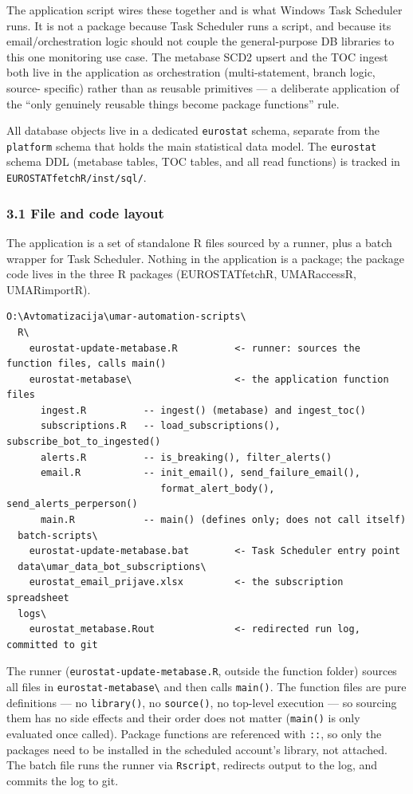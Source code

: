 \documentclass[
]{article}
\begin{document}
The application script wires these together and is what Windows Task
Scheduler runs. It is not a package because Task Scheduler runs a
script, and because its email/orchestration logic should not couple the
general-purpose DB libraries to this one monitoring use case. The
metabase SCD2 upsert and the TOC ingest both live in the application as
orchestration (multi-statement, branch logic, source- specific) rather
than as reusable primitives --- a deliberate application of the ``only
genuinely reusable things become package functions'' rule.

All database objects live in a dedicated \texttt{eurostat} schema,
separate from the \texttt{platform} schema that holds the main
statistical data model. The \texttt{eurostat} schema DDL (metabase
tables, TOC tables, and all read functions) is tracked in
\texttt{EUROSTATfetchR/inst/sql/}.

\subsubsection{3.1 File and code layout}\label{file-and-code-layout}

The application is a set of standalone R files sourced by a runner, plus
a batch wrapper for Task Scheduler. Nothing in the application is a
package; the package code lives in the three R packages (EUROSTATfetchR,
UMARaccessR, UMARimportR).

\begin{verbatim}
O:\Avtomatizacija\umar-automation-scripts\
  R\
    eurostat-update-metabase.R          <- runner: sources the function files, calls main()
    eurostat-metabase\                  <- the application function files
      ingest.R          -- ingest() (metabase) and ingest_toc()
      subscriptions.R   -- load_subscriptions(), subscribe_bot_to_ingested()
      alerts.R          -- is_breaking(), filter_alerts()
      email.R           -- init_email(), send_failure_email(),
                           format_alert_body(), send_alerts_perperson()
      main.R            -- main() (defines only; does not call itself)
  batch-scripts\
    eurostat-update-metabase.bat        <- Task Scheduler entry point
  data\umar_data_bot_subscriptions\
    eurostat_email_prijave.xlsx         <- the subscription spreadsheet
  logs\
    eurostat_metabase.Rout              <- redirected run log, committed to git
\end{verbatim}

The runner (\texttt{eurostat-update-metabase.R}, outside the function
folder) sources all files in \texttt{eurostat-metabase\textbackslash{}}
and then calls \texttt{main()}. The function files are pure definitions
--- no \texttt{library()}, no \texttt{source()}, no top-level execution
--- so sourcing them has no side effects and their order does not matter
(\texttt{main()} is only evaluated once called). Package functions are
referenced with \texttt{::}, so only the packages need to be installed
in the scheduled account's library, not attached. The batch file runs
the runner via \texttt{Rscript}, redirects output to the log, and
commits the log to git.
\end{document}
